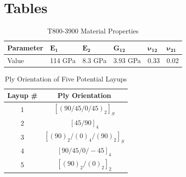 \documentclass[12pt]{article}
\begin{document}
\section{Tables}
\begin{table}[h]\footnotesize
	\centering
	\begin{tabular}{ |l|l|l|l|l|l| }
		\hline
		Parameter&$\mathbf{E_1}$& $\mathbf{E_2}$ & $\mathbf{G_{12}}$ & $\mathbf{\nu_{12}}$ & $\mathbf{\nu_{21}}$ \\ \hline
		Value& 114 GPa & 8.3 GPa& 3.93 GPa &0.33 & 0.02\\ \hline
	\end{tabular}
	\caption{T800-3900 Material Properties}
	\label{tab:Material Properties}%
\end{table}
\begin{table}[h]
	\centering
	\begin{tabular}{cc}
		Layup \# & Ply Orientation \\
		\midrule
		\midrule
		1     &$ [(90/45/0/45)_2]_S$ \\
		2     &$ [45/90]_4$ \\
		3     &$ [(90)_2/(0)_4/(90)_2]_S$ \\
		4     &$ [90/45/0/-45]_4$ \\
		5     &$ [(90)_2/(0)_2]_2$ \\
	\end{tabular}%
	\caption{Ply Orientation of Five Potential Layups}
    \label{tab:Ply}%
\end{table}%
\end{document}
